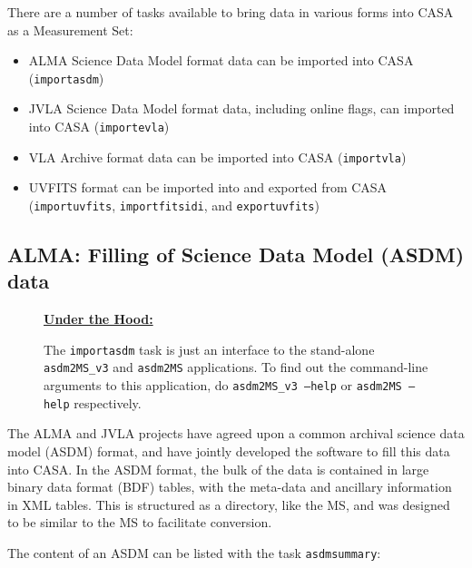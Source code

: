 There are a number of tasks available to bring data in various forms
into CASA as a Measurement Set:

\begin{itemize}

\item ALMA Science Data Model format data can be imported
      into CASA ({\tt importasdm})

\item JVLA Science Data Model format data, including online flags,
      can imported into CASA ({\tt importevla})

\item VLA Archive format data can be imported into CASA
      ({\tt importvla})

\item UVFITS format can be imported into and exported from CASA
      ({\tt importuvfits}, {\tt importfitsidi}, and {\tt exportuvfits})

\end{itemize}

\subsection{ALMA: Filling of Science Data Model (ASDM) data}
\label{section:io.import.asdm}

\begin{wrapfigure}{r}{2.5in}
  \begin{boxedminipage}{2.5in}
     \centerline{\underline{\bf Under the Hood:}}
     The {\tt importasdm} task is just an interface to the stand-alone
     {\tt asdm2MS\_v3} and {\tt asdm2MS} applications.  To find out the command-line
     arguments to this application, do {\tt asdm2MS\_v3 --help} or {\tt asdm2MS --help} respectively.
 \end{boxedminipage}
\end{wrapfigure}

The ALMA and JVLA projects have agreed upon a common archival science
data model (ASDM) format, and have jointly developed the software to
fill this data into CASA.  In the ASDM format, the bulk of the data is
contained in large binary data format (BDF) tables, with the meta-data
and ancillary information in XML tables.  This is structured as a
directory, like the MS, and was designed to be similar to the MS to 
facilitate conversion.

The content of an ASDM can be listed with the task {\tt asdmsummary}:

